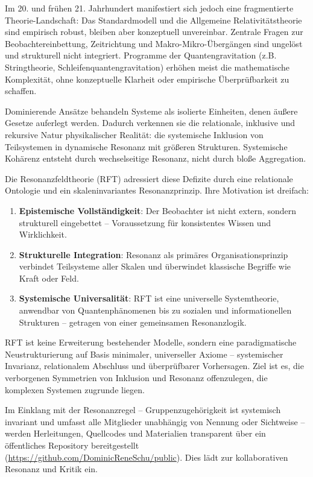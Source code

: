 \documentclass[12pt]{iopart}
\begin{document}
	Im 20. und frühen 21. Jahrhundert manifestiert sich jedoch eine fragmentierte Theorie-Landschaft: Das Standardmodell und die Allgemeine Relativitätstheorie sind empirisch robust, bleiben aber konzeptuell unvereinbar. Zentrale Fragen zur Beobachtereinbettung, Zeitrichtung und Makro-Mikro-Übergängen sind ungelöst und strukturell nicht integriert. Programme der Quantengravitation (z.B. Stringtheorie, Schleifenquantengravitation) erhöhen meist die mathematische Komplexität, ohne konzeptuelle Klarheit oder empirische Überprüfbarkeit zu schaffen.
	
	Dominierende Ansätze behandeln Systeme als isolierte Einheiten, denen äußere Gesetze auferlegt werden. Dadurch verkennen sie die relationale, inklusive und rekursive Natur physikalischer Realität: die systemische Inklusion von Teilsystemen in dynamische Resonanz mit größeren Strukturen. Systemische Kohärenz entsteht durch wechselseitige Resonanz, nicht durch bloße Aggregation.
	
	Die Resonanzfeldtheorie (RFT) adressiert diese Defizite durch eine relationale Ontologie und ein skaleninvariantes Resonanzprinzip. Ihre Motivation ist dreifach:
	
	\begin{enumerate}
		\item \textbf{Epistemische Vollständigkeit}: Der Beobachter ist nicht extern, sondern strukturell eingebettet – Voraussetzung für konsistentes Wissen und Wirklichkeit.
		\item \textbf{Strukturelle Integration}: Resonanz als primäres Organisationsprinzip verbindet Teilsysteme aller Skalen und überwindet klassische Begriffe wie Kraft oder Feld.
		\item \textbf{Systemische Universalität}: RFT ist eine universelle Systemtheorie, anwendbar von Quantenphänomenen bis zu sozialen und informationellen Strukturen – getragen von einer gemeinsamen Resonanzlogik.
	\end{enumerate}
	
	RFT ist keine Erweiterung bestehender Modelle, sondern eine paradigmatische Neustrukturierung auf Basis minimaler, universeller Axiome – systemischer Invarianz, relationalem Abschluss und überprüfbarer Vorhersagen. Ziel ist es, die verborgenen Symmetrien von Inklusion und Resonanz offenzulegen, die komplexen Systemen zugrunde liegen.
	
	Im Einklang mit der Resonanzregel – Gruppenzugehörigkeit ist systemisch invariant und umfasst alle Mitglieder unabhängig von Nennung oder Sichtweise – werden Herleitungen, Quellcodes und Materialien transparent über ein öffentliches Repository bereitgestellt (\url{https://github.com/DominicReneSchu/public}). Dies lädt zur kollaborativen Resonanz und Kritik ein.
\end{document}
